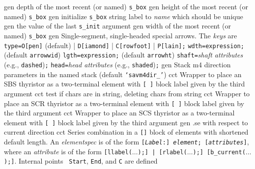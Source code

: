   {gen}
  {depth of the most recent (or named) {\tt s\_box}
    }
  {gen}
  {height of the most recent (or named) {\tt s\_box}
    }
  {gen}
  {initialize {\tt s\_box} string label to {\sl name} which should
  be unique
    }
  {gen}
  {the value of the last {\tt s\_init} argument
    }
  {gen}
  {width of the most recent (or named) {\tt s\_box}
    }
  {gen}
  {Single-segment, single-headed special arrows.
    The {\sl keys} are
       {\tt type=}{\tt O[pen]} (default)
          | {\tt D[iamond]} | {\tt C[rowfoot]} | {\tt P[lain]}{\tt ;}
       {\tt wdth=}{\tt expression}{\tt ;} (default {\tt arrowwid})
       {\tt lgth=}{\tt expression}{\tt ;} (default {\tt arrowht})
       {\tt shaft=}{\sl shaft attributes} (e.g., {\tt dashed}){\tt ;}
       {\tt head=}{\sl head attributes} (e.g., {\tt shaded}){\tt ;}
  }
  {gen}
  {Stack m4 direction parameters in the named stack
    (default {\tt `savm4dir\_'})}
  {cct}
  {Wrapper to place an SBS thyristor as a two-terminal element with
   {\tt [ ]} block label given by the third argument
    }
  {cct}
  {test if chars are in string, deleting chars from string}
  {cct}
  {Wrapper to place an SCR thyristor as a two-terminal element with
   {\tt [ ]} block label given by the third argument
    }
  {cct}
  {Wrapper to place an SCS thyristor as a two-terminal element with
   {\tt [ ]} block label given by the third argument
    }
  {gen}
  {.se with respect to current direction}
  {cct}
  { Series combination in a {\tt []} block of elements
    with shortened default length.  An {\sl elementspec} is of the
    form {\tt [{\sl Label}:] {\sl element}; [{\sl attributes}]},
    where an {\sl attribute} is of the form {\tt [llabel($\ldots$);] |
    [rlabel($\ldots$);] [b\_current($\ldots$);]}.  Internal points {\tt
    Start}, {\tt End}, and {\tt C} are defined
    }
